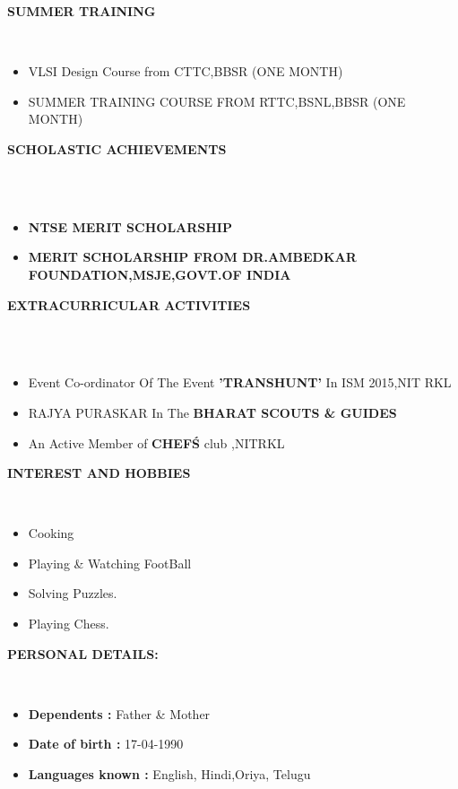 \documentclass[a4paper,10pt]{article}
\newcommand{\lsep}{-0.5cm}
\newcommand{\resheading}[1]{{\small \colorbox{mygrey}{\begin{minipage}{0.975\textwidth}{\textbf{#1 \vphantom{p\^{E}}}}\end{minipage}}}}
\begin{document}
\resheading{\textbf{SUMMER TRAINING} }\\[\lsep]
\begin{itemize}
\item {VLSI Design Course from CTTC,BBSR
} (ONE MONTH) \\[-0.3cm]
\item {SUMMER TRAINING COURSE FROM RTTC,BSNL,BBSR
} (ONE MONTH) \\[-0.3cm]
 \end{itemize}
	
\resheading{\textbf{SCHOLASTIC ACHIEVEMENTS} }\\[\lsep]\\[0.1cm]
\begin{itemize}
\item \textbf{NTSE MERIT SCHOLARSHIP
}  \\[-0.3cm]
\item \textbf{MERIT SCHOLARSHIP FROM DR.AMBEDKAR FOUNDATION,MSJE,GOVT.OF INDIA
}\\[-0.3cm]
\end{itemize}

	
\resheading{\textbf{EXTRACURRICULAR ACTIVITIES} }\\[\lsep]\\[0.1cm]
\begin{itemize}
\item {Event Co-ordinator Of The Event {\bf'TRANSHUNT'} In  ISM 2015,NIT RKL
}\\[-0.3cm]
\item {RAJYA PURASKAR In  The  {\bf BHARAT SCOUTS \& GUIDES}
} \\[-0.3cm]
\item {An Active Member of {\bf CHEF\'S }club ,NITRKL
}  \\[-0.3cm]
\end{itemize}



\resheading{\textbf{INTEREST AND HOBBIES} }\\[\lsep]
\begin{itemize}
\item \noindent Cooking
\item \noindent Playing \& Watching FootBall
\item \noindent Solving Puzzles.
\item \noindent Playing Chess.

\end{itemize}

\resheading{\textbf{PERSONAL DETAILS:} }\\[\lsep]
\begin{itemize}
\item \textbf{	Dependents  :	}	Father \& Mother
 \\[-0.5cm]
\item \textbf{	Date of birth  : }  17-04-1990
 \\[-0.5cm]
 

\item \textbf{	Languages known  : }     English, Hindi,Oriya, Telugu
 \\
  
	\end{itemize}
	
\end{document}

